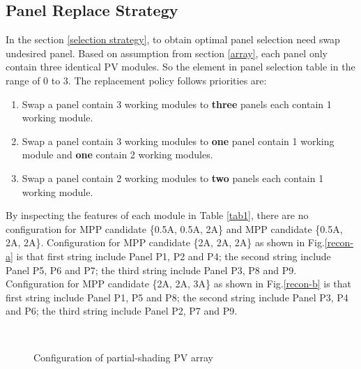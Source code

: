 \documentclass[conference]{IEEEtran}
\begin{document}
\subsection{Panel Replace Strategy}
In the section \ref{selection strategy}, to obtain optimal panel selection need swap undesired panel. Based on assumption from section \ref{array}, each panel only contain three identical PV modules. So the element in panel selection table in the range of 0 to 3. The replacement policy follows priorities are:
\begin{enumerate} [ (1) ]
\item Swap a panel contain 3 working modules to \textbf{three} panels each contain 1 working module.
\item Swap a panel contain 3 working modules to \textbf{one} panel contain 1 working module and \textbf{one} contain 2 working modules.
\item Swap a panel contain 2 working modules to \textbf{two} panels each contain 1 working module.
\end{enumerate}

By inspecting the features of each module in Table \ref{tab1}, there are no configuration for MPP candidate \{0.5A, 0.5A, 2A\} and MPP candidate \{0.5A, 2A, 2A\}. Configuration for MPP candidate \{2A, 2A, 2A\} as shown in Fig.\ref{recon-a} is that first string include Panel P1, P2 and P4; the second string include Panel P5, P6 and P7; the third string include Panel P3, P8 and P9. Configuration for MPP candidate \{2A, 2A, 3A\} as shown in Fig.\ref{recon-b} is that first string include Panel P1, P5 and P8; the second string include Panel P3, P4 and P6; the third string include Panel P2, P7 and P9.

\begin{figure}
\centering 
{}
 \\
\caption{Configuration of partial-shading PV array}
\end{figure}
\end{document}
